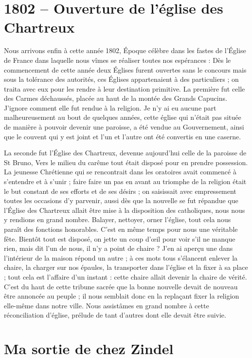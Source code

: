 \documentclass[11pt,a4paper]{report}
\begin{document}
\section*{1802 -- Ouverture de l'église des Chartreux}

Nous arrivons enfin à cette année 1802, Époque célèbre dans les fastes de l'Église de France dans laquelle nous vîmes se réaliser toutes nos espérances : Dès le commencement de cette année deux Églises furent ouvertes sans le concours mais sous la tolérance des autorités, ces Églises appartenaient à des particuliers ; on traita avec eux pour les rendre à leur destination primitive. La première fut celle des Carmes déchaussés, placée au haut de la montée des Grands Capucins. J'ignore comment elle fut rendue à la religion. Je n'y ai eu aucune part malheureusement au bout de quelques années, cette église qui n'était pas située de manière à pouvoir devenir une paroisse, a été vendue au Gouvernement, ainsi que le couvent qui y est joint et l'un et l'autre ont été convertis en une caserne.

La seconde fut l'Église des Chartreux, devenue aujourd'hui celle de la paroisse de St Bruno, Vers le milieu du carême tout était disposé pour en prendre possession. La jeunesse Chrétienne qui se rencontrait dans les oratoires avait commencé à s'entendre et à s'unir ; faire faire un pas en avant au triomphe de la religion était le but constant de ses efforts et de ses désirs ; on saisissait avec empressement toutes les occasions d'y parvenir, aussi dès que la nouvelle se fut répandue que l'Église des Chartreux allait être mise à la disposition des catholiques, nous nous y rendions en grand nombre. Balayer, nettoyer, orner l'église, tout cela nous paraît des fonctions honorables. C'est en même temps pour nous une véritable fête. Bientôt tout est disposé, on jette un coup d'œil pour voir s'il ne manque rien, mais dit l'un de nous, il n'y a point de chaire ? J'en ai aperçu une dans l'intérieur de la maison répond un autre ; à ces mots tous s'élancent enlever la chaire, la charger sur nos épaules, la transporter dans l'église et la fixer à sa place ; tout cela est l'affaire d'un instant : cette chaire allait devenir la chaire de vérité. C'est du haut de cette tribune sacrée que la bonne nouvelle devait de nouveau être annoncée au peuple ; il nous semblait donc en la replaçant fixer la religion elle-même dans notre ville. Nous assistâmes en grand nombre à cette réconciliation d'église, prélude de tant d'autres dont elle devait être suivie.

\section*{Ma sortie de chez Zindel}
\end{document}
